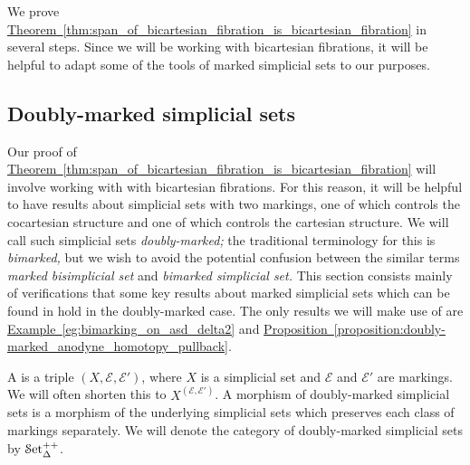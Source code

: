 \documentclass[main.tex]{subfiles}
\begin{document}
We prove \hyperref[thm:span_of_bicartesian_fibration_is_bicartesian_fibration]{Theorem~\ref*{thm:span_of_bicartesian_fibration_is_bicartesian_fibration}} in several steps. Since we will be working with bicartesian fibrations, it will be helpful to adapt some of the tools of marked simplicial sets to our purposes.

\subsection{Doubly-marked simplicial sets}
\label{ssc:doubly-marked_simplicial_sets}

Our proof of \hyperref[thm:span_of_bicartesian_fibration_is_bicartesian_fibration]{Theorem~\ref*{thm:span_of_bicartesian_fibration_is_bicartesian_fibration}} will involve working with with bicartesian fibrations. For this reason, it will be helpful to have results about simplicial sets with two markings, one of which controls the cocartesian structure and one of which controls the cartesian structure. We will call such simplicial sets \emph{doubly-marked;} the traditional terminology for this is \emph{bimarked,} but we wish to avoid the potential confusion between the similar terms \emph{marked bisimplicial set} and \emph{bimarked simplicial set.} This section consists mainly of verifications that some key results about marked simplicial sets which can be found in \cite[Sec.\ 3.1]{highertopostheory} hold in the doubly-marked case. The only results we will make use of are \hyperref[eg:bimarking_on_asd_delta2]{Example~\ref*{eg:bimarking_on_asd_delta2}} and \hyperref[proposition:doubly-marked_anodyne_homotopy_pullback]{Proposition~\ref*{proposition:doubly-marked_anodyne_homotopy_pullback}}.

\begin{definition}
  A  is a triple $(X, \mathcal{E}, \mathcal{E}')$, where $X$ is a simplicial set and $\mathcal{E}$ and $\mathcal{E}'$ are markings. We will often shorten this to $X^{(\mathcal{E}, \mathcal{E}')}$. A morphism of doubly-marked simplicial sets is a morphism of the underlying simplicial sets which preserves each class of markings separately. We will denote the category of doubly-marked simplicial sets by $\mathcal{S}\mathrm{et}_{\Delta}^{++}$.
\end{definition}
\end{document}
